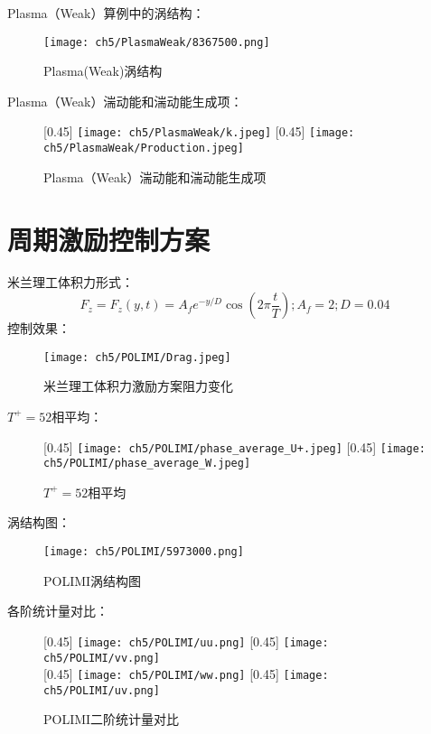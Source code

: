Plasma（Weak）算例中的涡结构：
\begin{figure}
  \centering
  \texttt{[image: ch5/PlasmaWeak/8367500.png]}
  \caption{Plasma(Weak)涡结构}
\end{figure}
Plasma（Weak）湍动能和湍动能生成项：
\begin{figure}
  \centering
  [0.45\textwidth]
    {\texttt{[image: ch5/PlasmaWeak/k.jpeg]}}
  [0.45\textwidth]
    {\texttt{[image: ch5/PlasmaWeak/Production.jpeg]}}
  \caption{Plasma（Weak）湍动能和湍动能生成项}
\end{figure}

\section{周期激励控制方案}
米兰理工体积力形式：
\begin{equation}\label{e:f_POLIMI}
  F_z  = F_z \left( {y,t} \right) = A_f e^{ - y/D} \cos \left( {2\pi \frac{t}{T}} \right);A_f  = 2;D = 0.04
\end{equation}
控制效果：
\begin{figure}
  \centering
  \texttt{[image: ch5/POLIMI/Drag.jpeg]}
  \caption{米兰理工体积力激励方案阻力变化}\label{f:POLIMI_DARG}
\end{figure}
$T^+=52$相平均：
\begin{figure}
  \centering
  [0.45\textwidth]
    {\texttt{[image: ch5/POLIMI/phase\_average\_U+.jpeg]}}
  [0.45\textwidth]
    {\texttt{[image: ch5/POLIMI/phase\_average\_W.jpeg]}}
  \caption{$T^+=52$相平均}
\end{figure}
涡结构图：
\begin{figure}
  \centering
  \texttt{[image: ch5/POLIMI/5973000.png]}
  \caption{POLIMI涡结构图}
\end{figure}
各阶统计量对比：
\begin{figure}[h]
  \centering
  [0.45\textwidth] %
    {\texttt{[image: ch5/POLIMI/uu.png]}}%
  [0.45\textwidth]
    {\texttt{[image: ch5/POLIMI/vv.png]}}%
  \\\bigskip
  [0.45\textwidth] %
    {\texttt{[image: ch5/POLIMI/ww.png]}}%
  [0.45\textwidth]
    {\texttt{[image: ch5/POLIMI/uv.png]}}%
  \caption{POLIMI二阶统计量对比}
\end{figure}
